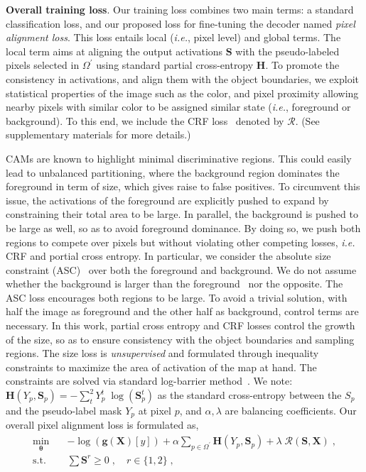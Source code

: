 \documentclass[twocolumn]{article}
\makeatletter
\theoremstyle{definition}
\newcommand*{\ie}{\emph{i.e.}\@\xspace}
\makeatother
\begin{document}
\noindent \textbf{Overall training loss}. Our training loss combines two main terms: a standard classification loss, and our proposed loss for fine-tuning the decoder named \emph{pixel alignment loss}. This loss entails local (\ie, pixel level) and global terms. The local term aims at aligning the output activations ${\bm{S}}$ with the pseudo-labeled pixels selected in ${\Omega^{\prime}}$ using standard partial cross-entropy ${\bm{H}}$.  To promote the consistency in activations, and align them with the object boundaries, we exploit statistical properties of the image such as the color, and pixel proximity allowing nearby pixels with similar color to be assigned similar state (\ie, foreground or background). To this end, we include the CRF loss~\cite{tang2018regularized} denoted by ${\mathcal{R}}$. (See supplementary materials for more details.)

CAMs are known to highlight minimal discriminative regions. This could easily lead to unbalanced partitioning, where the background region dominates the foreground in term of size, which gives raise to false positives. To circumvent this issue, the activations of the foreground are explicitly pushed to expand by constraining their total area to be large. In parallel, the background is pushed to be large as well, so as to avoid foreground dominance. By doing so, we push both regions to compete over pixels but without violating other competing losses, \ie CRF and portial cross entropy. In particular, we consider the absolute size constraint (ASC)~\cite{belharbi2020minmaxuncer} over both the foreground and background. We do not assume whether the background is larger than the foreground~\cite{pathak2015constrained} nor the opposite. The ASC loss encourages both regions to be large. To avoid a trivial solution, with half the image as foreground and the other half as background, control terms are necessary. In this work, partial cross entropy and CRF losses control the growth of the size, so as to ensure consistency with the object boundaries and sampling regions. The size loss is {\em unsupervised} and formulated through inequality constraints to maximize the area of activation of the map at hand. The constraints are solved via standard log-barrier method~\cite{boyd2004convex}.
We note: ${\bm{H}(Y_p, \bm{S}_p) = - \sum_{t}^2 Y_p^t\; \log(\bm{S}_p^t)}$ as the standard cross-entropy between the ${S_p}$ and the pseudo-label mask ${Y_p}$ at pixel ${p}$, and ${\alpha, \lambda}$ are balancing coefficients. Our overall pixel alignment loss is formulated as,
\begin{equation}
\label{eq:totalloss}
\begin{aligned}
\min_{\bm{\theta}} \quad & - \log(\bm{g}(\bm{X})[y]) + \alpha \sum_{p \in \Omega^{\prime}} \bm{H}(Y_p, \bm{S}_p) + \lambda\; \mathcal{R}(\bm{S}, \bm{X}) \;,\\
\textrm{s.t.} \quad & \sum \bm{S}^r \geq 0 \;, \quad r \in \{1, 2\} \;,\\
\end{aligned}
\end{equation}
\end{document}
